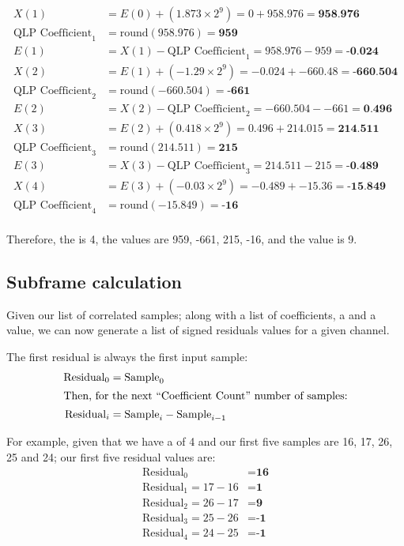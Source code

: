 \begin{align*}
X(1) &= E(0) + (1.873 \times 2 ^ {9} ) = 0 + 958.976 = \textbf{958.976} \\
\text{QLP Coefficient}_1 &= \text{round}(958.976) = \textbf{959} \\
E(1) &= X(1) - \text{QLP Coefficient}_1 = 958.976 - 959 = \textbf{-0.024} \\
X(2) &= E(1) + (-1.29 \times 2 ^ {9} ) = -0.024 + -660.48 = \textbf{-660.504} \\
\text{QLP Coefficient}_2 &= \text{round}(-660.504) = \textbf{-661} \\
E(2) &= X(2) - \text{QLP Coefficient}_2 = -660.504 - -661 = \textbf{0.496} \\
X(3) &= E(2) + (0.418 \times 2 ^ {9} ) = 0.496 + 214.015 = \textbf{214.511} \\
\text{QLP Coefficient}_3 &= \text{round}(214.511) = \textbf{215} \\
E(3) &= X(3) - \text{QLP Coefficient}_3 = 214.511 - 215 = \textbf{-0.489} \\
X(4) &= E(3) + (-0.03 \times 2 ^ {9} ) = -0.489 + -15.36 = \textbf{-15.849} \\
\text{QLP Coefficient}_4 &= \text{round}(-15.849) = \textbf{-16} \\
\end{align*}
\par
\noindent
Therefore, the  is 4,
the  values are 959, -661, 215, -16,
and the  value is 9.


\clearpage

\subsection{Subframe calculation}

Given our list of correlated samples; along with a list of
coefficients, a  and a 
value, we can now generate a list of signed residuals values
for a given channel.

The first residual is always the first input sample:
\begin{align*}
\text{Residual}_0 &= \text{Sample}_0 \\
\intertext{Then, for the next ``{Coefficient Count}'' number of samples:}
\text{Residual}_i &= \text{Sample}_i - \text{Sample}_{i - 1}
\end{align*}

For example, given that we have a  of 4
and our first five samples are 16, 17, 26, 25 and 24;
our first five residual values are:
\begin{align*}
\text{Residual}_0 &= \textbf{16} \\
\text{Residual}_1 = 17 - 16 &= \textbf{1} \\
\text{Residual}_2 = 26 - 17 &= \textbf{9} \\
\text{Residual}_3 = 25 - 26 &= \textbf{-1} \\
\text{Residual}_4 = 24 - 25 &= \textbf{-1}
\end{align*}

